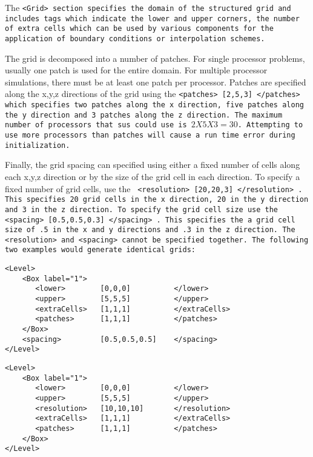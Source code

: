 The \tt <Grid> \normalfont section specifies the domain of the
structured grid and includes tags which indicate the lower and upper
corners, the number of extra cells which can be used by various
components for the application of boundary conditions or interpolation
schemes.  

The grid is decomposed into a number of patches.  For single processor
problems, usually one patch is used for the entire domain.  For
multiple processor simulations, there must be at least one patch per
processor.  Patches are specified along the x,y,z directions of the
grid using the \tt <patches> [2,5,3] </patches> \normalfont which
specifies two patches along the x direction, five patches along the y
direction and 3 patches along the z direction.  The maximum number of
processors that \tt sus \normalfont could use is $2X5X3 = 30$.
Attempting to use more processors than patches
will cause a run time error during initialization.

Finally, the grid spacing can specified using either a fixed number of
cells along each x,y,z direction or by the size of the grid cell in
each direction.  To specify a fixed number of grid cells, use the \tt
<resolution> [20,20,3] </resolution> \normalfont.  This specifies 20
grid cells in the x direction, 20 in the y direction and 3 in the z
direction.  To specify the grid cell size use the \tt <spacing>
[0.5,0.5,0.3] </spacing> \normalfont.  This specifies the a grid cell
size of .5 in the x and y directions and .3 in the z direction.  The
\tt <resolution> \normalfont and \tt <spacing> \normalfont cannot be
specified together.  The following two examples would generate
identical grids:

\begin{Verbatim}[fontsize=\footnotesize]
<Level>
    <Box label="1">
       <lower>        [0,0,0]          </lower>
       <upper>        [5,5,5]          </upper>
       <extraCells>   [1,1,1]          </extraCells>
       <patches>      [1,1,1]          </patches>
    </Box>
    <spacing>         [0.5,0.5,0.5]    </spacing>
</Level>
\end{Verbatim}
\begin{Verbatim}[fontsize=\footnotesize]
<Level>
    <Box label="1">
       <lower>        [0,0,0]          </lower>
       <upper>        [5,5,5]          </upper>
       <resolution>   [10,10,10]       </resolution>
       <extraCells>   [1,1,1]          </extraCells>
       <patches>      [1,1,1]          </patches>
    </Box>
</Level>
\end{Verbatim}


